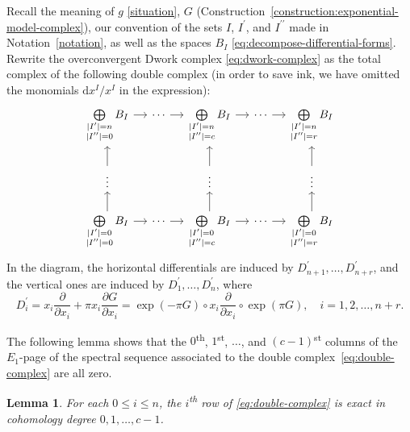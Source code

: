 \documentclass{amsart}
\numberwithin{equation}{section}
\theoremstyle{plain}
\newtheorem{lemma}[equation]{Lemma}
\theoremstyle{definition}
\begin{document}
Recall the meaning of \(g\) \eqref{situation}, \(G\) (Construction~\ref{construction:exponential-model-complex}),
our convention of the sets \(I\), \(I^{\prime}\), and
\(I^{\prime\prime}\) made in Notation~\ref{notation},
as well as the spaces \(B_{I}\) \eqref{eq:decompose-differential-forms}.
Rewrite the
overconvergent Dwork complex \eqref{eq:dwork-complex} as the total
complex of the following double complex (in order to save ink, we have
omitted the monomials \(\mathrm{d}x^I/x^I\) in the expression):
\begin{equation}\label{eq:double-complex}
  \begin{tikzcd}[column sep=small]
    \bigoplus\limits_{\substack{|I^{\prime}|=n \\|I^{\prime\prime}|=0}}B_I \ar[r] & \cdots \ar[r] & \bigoplus\limits_{\substack{|I^{\prime}|=n \\|I^{\prime\prime}|=c}}B_I  \ar[r] & \cdots \ar[r] & \bigoplus\limits_{\substack{|I^{\prime}|=n \\|I^{\prime\prime}|=r}}B_I \\
    {\vdots} \ar[u] & {} & {\vdots} \ar[u]  & {} & {\vdots} \ar[u] \\
    \bigoplus\limits_{\substack{|I^{\prime}|=0 \\|I^{\prime\prime}|=0}}B_I \ar[r] \ar[u]& \cdots \ar[r] & \bigoplus\limits_{\substack{|I^{\prime}|=0 \\|I^{\prime\prime}|=c}}B_I \ar[u]  \ar[r] & \cdots \ar[r] & \bigoplus\limits_{\substack{|I^{\prime}|=0 \\|I^{\prime\prime}|=r}}B_I \ar[u]
  \end{tikzcd}
\end{equation}
In the diagram, the horizontal differentials are induced by
\(D^{\prime}_{n+1},\ldots,D^{\prime}_{n+r}\),
and the vertical ones are induced by \(D^{\prime}_1,\ldots,D^{\prime}_{n}\),
where
\begin{equation}
D^{\prime}_{i} = x_{i}\frac{\partial}{\partial x_i} + \pi x_{i}\frac{\partial G}{\partial x_{i}}
=\exp(-\pi G) \circ x_{i}\frac{\partial}{\partial x_i}\circ \exp(\pi G), \quad i=1,2,\ldots,n+r.
\end{equation}


The following lemma shows that the \(0\)\textsuperscript{th},
\(1\)\textsuperscript{st}, \(\ldots\), and \((c-1)\)\textsuperscript{st} columns
of the \(E_1\)-page of the spectral sequence associated to the double
complex~\eqref{eq:double-complex} are all zero.

\begin{lemma}
  \label{lemma:c-exactness-of-rows}
  For each \(0\leq i\leq n\), the \(i\)\textsuperscript{th} row of
  \eqref{eq:double-complex} is exact in cohomology degree \(0,1,\ldots,c-1\).
\end{lemma}
\end{document}
